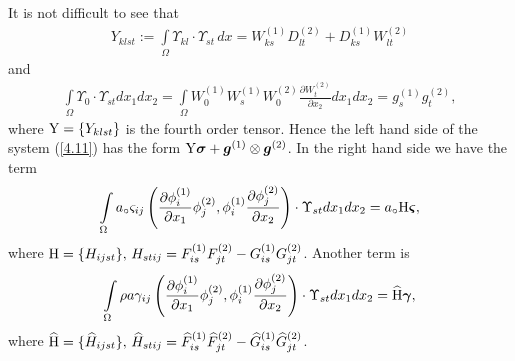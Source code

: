 \documentclass[amstex,amstext,amsfonts,epsf,12pt] {amsart}
\newcommand\be{\begin{eqnarray*}}
\newcommand\ee{\end{eqnarray*}}
\def\be{\begin{eqnarray*}}
\def\ee{\end{eqnarray*}}
\def\IntO{\int\limits_\Omega}
\def\wh{\widehat}
\def\phix{\phi^{(1)}}
\def\phiy{\phi^{(2)}}
\def\Wx{W^{(1)}}
\def\Wy{W^{(2)}}
\def\bgamma{\boldsymbol\gamma}
\def\bvarsigma{\boldsymbol\varsigma}
\def\bg{\boldsymbol g}
\begin{document}
It is not difficult to see that
\be
Y_{klst}:=\IntO \Upsilon_{kl}\cdot\Upsilon_{st}\,dx
=W^{(1)}_{ks}D^{(2)}_{lt}+D^{(1)}_{ks}W^{(2)}_{lt}
\ee
and
\be
\IntO \Upsilon_0\cdot\Upsilon_{st} dx_1dx_2=
\IntO \Wx_0 \Wx_{s}  
\Wy_0 \frac{\partial\Wy_{t} }{\partial x_2}dx_1dx_2=g^{(1)}_{s}
g^{(2)}_{t},
\ee
where ${\rm Y}=\{Y_{klst}\}$ is the fourth order tensor.
Hence the left hand side of the system (\ref{4.11}) has the form ${\rm Y}{\boldsymbol\sigma}+\bg^{(1)}\otimes \bg^{(2)}$.
In  the right hand side we have the term
\be
\IntO a_\circ \varsigma_{ij}\left(\frac{\partial\phix_{i}}{\partial x_1}\phiy_{j},
 \phix_{i}\frac{\partial\phiy_{j}}{\partial x_2}\right)\cdot \Upsilon_{st}
dx_1dx_2
 =a_\circ {\rm H}\bvarsigma,
\ee
where ${\rm H}=\{H_{ijst}\},\,
H_{stij}=
F^{(1)}_{is}F^{(2)}_{jt}-G^{(1)}_{is}G^{(2)}_{jt}$.
Another term is
\be
\IntO \rho a \gamma_{ij}
\left(\frac{\partial\phix_{i}}{\partial x_1}\phiy_{j},
 \phix_{i}\frac{\partial\phiy_{j}}{\partial x_2}\right)\cdot \Upsilon_{st}
dx_1dx_2
= \wh {\rm H}\bgamma,
\ee
where $\wh{\rm H}=\{\wh H_{ijst}\},\,
\wh H_{stij}=
\wh F^{(1)}_{is}\wh F^{(2)}_{jt}-\wh G^{(1)}_{is}\wh G^{(2)}_{jt}$.
\end{document}
